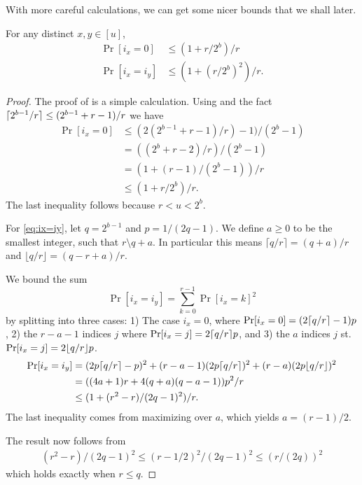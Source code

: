 With
more careful calculations, we can get some nicer bounds
that we shall later.
\begin{lemma}\label{lem:ix-r-dist} For any distinct $x,y\in [u]$, 
\begin{align}
\Pr[i_x=0]&\le(1+r/2^b)/r\label{eq:ix=0}\\
\Pr[i_x=i_y]&\leq \left(1+(r/2^b)^2\right)/r.\label{eq:ix=iy}
\end{align}
\end{lemma}
\begin{proof}
The proof of  is a simple calculation.
Using  and the fact $\lceil {2^{b-1}/r}\rceil\le(2^{b-1}+r-1)/r$ we have
\begin{align*}
\Pr[i_x=0]&\le (2(2^{b-1}+r-1)/r)-1)/(2^{b}-1)\\
&=((2^b+r-2)/r)/(2^b-1)\\
&=\left(1+(r-1)/(2^b-1)\right)/r\\
&\le\left(1+r/2^b\right)/r.
\end{align*}
The last inequality follows because $r<u<2^b$.

For \ref{eq:ix=iy},
let $q=2^{b-1}$ and $p=1/(2q-1)$.
We define $a\ge 0$ to be the smallest integer, such that $r\setminus q+a$.
In particular this means 
$\lceil q/r\rceil = (q+a)/r$ and
$\lfloor q/r\rfloor = (q-r+a)/r$.

We bound the sum
$$
   \Pr[i_x=i_y]
   = \sum_{k=0}^{r-1} \Pr[i_x = k]^2
$$
by splitting into three cases:
1) The case $i_x=0$, where $\Pr[i_x=0]=(2\lceil {q/r}\rceil-1)p$,
2) the $r-a-1$ indices $j$ where $\Pr[i_x=j]=2\lceil {q/r}\rceil p$,
and 3) the $a$ indices $j$ st. $\Pr[i_x=j]=2\lfloor {q/r} \rfloor p$.
\begin{align*}
   \Pr[i_x=i_y]
   &=
   (2p\lceil { q/r}\rceil-p)^2 + (r-a-1) (2p \lceil q/r\rceil)^2 + (r-a) (2p \lfloor q/r \rfloor)^2
    \\&= ((4a+1)r+4(q+a)(q-a-1))p^2/r
   \\&\le (1 + (r^2-r)/(2q-1)^2) / r.
\end{align*}
The last inequality comes from maximizing over $a$, which yields $a=(r-1)/2$.

The result now follows from
\begin{align}
   (r^2-r)/(2q-1)^2
   \le
   (r-1/2)^2/(2q-1)^2
   \le
   (r/(2q))^2
\end{align}
which holds exactly when $r\le q$.



\end{proof}
